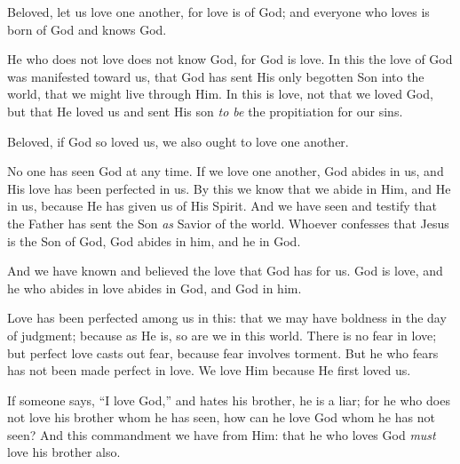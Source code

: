 
\bverse Beloved, let us love one another, for love is of God; and everyone who loves is born of God and knows God.

\bverse He who does not love does not know God, for God is love.
\bverse In this the love of God was manifested toward us, that God has sent His only begotten Son into the world, that we might live through Him.
\bverse In this is love, not that we loved God, but that He loved us and sent His son \textit{to be} the propitiation for our sins.

\bverse Beloved, if God so loved us, we also ought to love one another.


\bverse No one has seen God at any time. If we love one another, God abides in us, and His love has been perfected in us.
\bverse By this we know that we abide in Him, and He in us, because He has given us of His Spirit.
\bverse And we have seen and testify that the Father has sent the Son \textit{as} Savior of the world. 
\bverse Whoever confesses that Jesus is the Son of God, God abides in him, and he in God.

\bverse And we have known and believed the love that God has for us. God is love, and he who abides in love abides in God, and God in him.


\bverse Love has been perfected among us in this: that we may have boldness in the day of judgment; because as He is, so are we in this world.
\bverse There is no fear in love; but perfect love casts out fear, because fear involves torment. But he who fears has not been made perfect in love.
\bverse We love Him because He first loved us.


\bverse If someone says, ``I love God,'' and hates his brother, he is a liar; for he who does not love his brother whom he has seen, how can he love God whom he has not seen?
\bverse And this commandment we have from Him: that he who loves God \textit{must} love his brother also.
